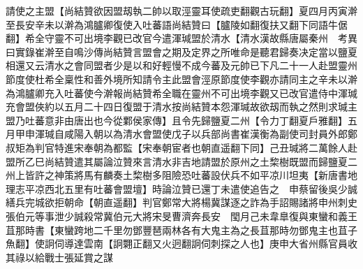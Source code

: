 請使之主盟【尚結贊欲因盟刼執二帥以取涇靈耳使疏吏翻觀古玩翻】夏四月丙寅澣至長安辛未以澣為鴻臚卿復使入吐蕃語尚結贊曰【臚陵如翻復扶又翻下同語牛倨翻】希全守靈不可出境李觀已改官今遣渾瑊盟於清水【清水漢故縣唐屬秦州　考異曰實錄崔澣至自鳴沙傳尚結贊言盟會之期及定界之所唯命是聽君歸奏决定當以鹽夏相還又云清水之會同盟者少是以和好輕慢不成今蕃及元帥已下凡二十一人赴盟靈州節度使杜希全稟性和善外境所知請令主此盟會涇原節度使李觀亦請同主之辛未以澣為鴻臚卿充入吐蕃使今澣報尚結贊希全職在靈州不可出境李觀又已改官遣侍中渾瑊充會盟俠約以五月二十四日復盟于清水按尚結贊本怨渾瑊故欲刼而執之然則求瑊主盟乃吐蕃意非由唐出也今從鄴侯家傳】且令先歸鹽夏二州【令力丁翻夏戶雅翻】五月甲申渾瑊自咸陽入朝以為清水會盟使戊子以兵部尚書崔漢衡為副使司封員外郎鄭叔矩為判官特進宋奉朝為都監【宋奉朝宦者也朝直遥翻下同】己丑瑊將二萬餘人赴盟所乙巳尚結贊遣其屬論泣贊來言清水非吉地請盟於原州之土棃樹既盟而歸鹽夏二州上皆許之神策將馬有麟奏土棃樹多阻險恐吐蕃設伏兵不如平凉川坦夷【新唐書地理志平凉西北五里有吐蕃會盟壇】時論泣贊已還丁未遣使追告之　申蔡留後吳少誠繕兵完城欲拒朝命【朝直遥翻】判官鄭常大將楊冀謀逐之詐為手詔賜諸將申州刺史張伯元等事泄少誠殺常冀伯元大將宋旻曹濟奔長安　閠月己未韋臯復與東蠻和義王苴那時書【東蠻跨地二千里勿鄧豐琶兩林各有大鬼主為之長苴那時勿鄧鬼主也苴子魚翻】使詗伺導達雲南【詗翾正翻又火迥翻詗伺刺探之人也】庚申大省州縣官員收其祿以給戰士張延賞之謀

